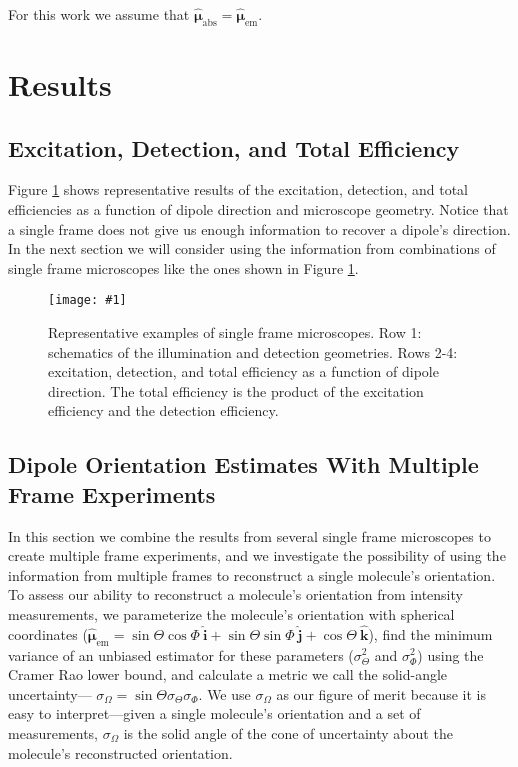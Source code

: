 \documentclass[11pt]{article}
\providecommand{\mb}[1]{\mathbf{#1}}
\providecommand{\bs}[1]{\boldsymbol{#1}}
\providecommand{\fig}[4]{
\begin{figure}[h]
 \captionsetup{width=1.0\linewidth}
 \centering
 \texttt{[image: \#1]}
 \caption{#3}
 \label{fig:#4}
\end{figure}
}
\begin{document}
For this work we assume that $\hat{\bs{\mu}}_{\text{abs}} = \hat{\bs{\mu}}_{\text{em}}$.

\section{Results}
\subsection{Excitation, Detection, and Total Efficiency}
Figure \ref{fig:efficiency} shows representative results of the excitation,
detection, and total efficiencies as a function of dipole direction and
microscope geometry. Notice that a single frame does not give us enough
information to recover a dipole's direction. In the next section we will
consider using the information from combinations of single frame microscopes
like the ones shown in Figure \ref{fig:efficiency}.

\fig{../figures/geometry.png}{1.0}{Representative examples of single frame microscopes. Row
  1: schematics of the illumination and detection geometries. Rows 2-4: excitation, detection, and total efficiency as a function of dipole direction. The total efficiency is the product of the excitation efficiency and the detection efficiency.}{efficiency}

\subsection{Dipole Orientation Estimates With Multiple Frame Experiments}
In this section we combine the results from several single frame microscopes to
create multiple frame experiments, and we investigate the possibility of using
the information from multiple frames to reconstruct a single molecule's
orientation. To assess our ability to reconstruct a molecule's orientation from
intensity measurements, we parameterize the molecule's orientation with
spherical coordinates
($\hat{\bs{\mu}}_{\text{em}} = \sin\Theta\cos\Phi\ \hat{\mb{i}} +
\sin\Theta\sin\Phi\ \hat{\mb{j}} + \cos\Theta\ \hat{\mb{k}}$), find the minimum
variance of an unbiased estimator for these parameters ($\sigma^2_{\Theta}$ and
$\sigma^2_{\Phi}$) using the Cramer Rao lower bound, and calculate a metric we
call the solid-angle uncertainty---
$\sigma_{\Omega} = \sin\Theta\sigma_{\Theta}\sigma_{\Phi}$. We use
$\sigma_{\Omega}$ as our figure of merit because it is easy to interpret---given
a single molecule's orientation and a set of measurements, $\sigma_{\Omega}$ is
the solid angle of the cone of uncertainty about the molecule's reconstructed
orientation.
\end{document}
